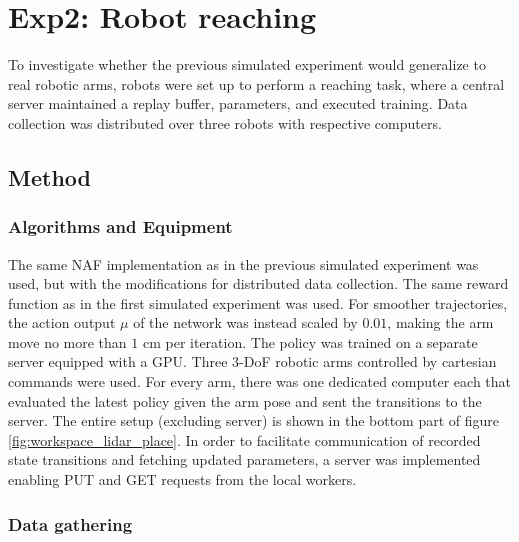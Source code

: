 \chapter{Exp2: Robot reaching}

To investigate whether the previous simulated experiment would generalize to
real robotic arms, robots were set up to perform a reaching task, where a
central server maintained a replay buffer, parameters, and executed training.
Data collection was distributed over three robots with respective computers.

\section{Method}

\subsection{Algorithms and Equipment}

The same NAF implementation as in the previous simulated experiment was used,
but with the modifications for distributed data collection. The same reward
function as in the first simulated experiment was used. For smoother
trajectories, the action output $\mu$ of the network was instead scaled by
$0.01$, making the arm move no more than $1$ cm per iteration. The policy was
trained on a separate server equipped with a GPU.  Three 3-DoF robotic arms
controlled by cartesian commands were used. For every arm, there was one
dedicated computer each that evaluated the latest policy given the arm pose and
sent the transitions to the server. The entire setup (excluding server) is
shown in the bottom part of figure \ref{fig:workspace_lidar_place}. In order to
facilitate communication of recorded state transitions and fetching updated
parameters, a server was implemented enabling PUT and GET requests from the
local workers.

\subsection{Data gathering}

